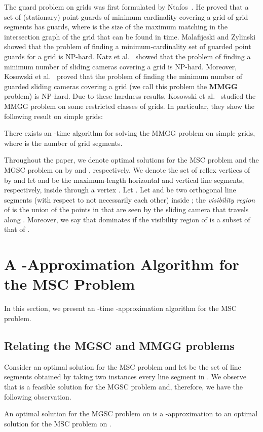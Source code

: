 \documentclass{llncs}
\begin{document}
The guard problem on grids was first formulated by Ntafos~\cite{ntafos1986}.
He proved that a set of (stationary) point guards of minimum cardinality covering a grid of
 grid segments has  guards, where  is the size of the maximum
matching in the intersection graph of the grid that can be found in 
time. Malafijeski and Zylinski~\cite{malafijeski2005} showed that the problem of
finding a minimum-cardinality set of guarded point guards for a grid is \textsc{NP}-hard.
Katz et al.~\cite{katz2005} showed that the problem of finding a minimum number
of sliding cameras covering a grid is \textsc{NP}-hard. Moreover,
Kosowski et al.~\cite{kosowski2004} proved that the problem of finding
the minimum number of guarded sliding cameras covering a grid (we call
this problem the {\bf MMGG} problem) is \textsc{NP}-hard.
Due to these hardness results, Kosowski et al.~\cite{adrian2006} studied
the MMGG problem on some restricted classes of grids. In particular, they show the following result
on simple grids:
\begin{theorem}
\label{thm:nSquarForGridProblem}
There exists an -time algorithm for solving the MMGG problem on
simple grids, where  is the number of grid segments.
\end{theorem}



Throughout the paper, we denote optimal solutions for the MSC problem and the MGSC problem on  by
 and , respectively.
We denote the set of reflex vertices of 
by  and let  and  be the maximum-length
horizontal and vertical line segments, respectively, inside  through a vertex
. Let .
Let  and  be two
orthogonal line segments (with respect to  not necessarily each other) inside ; the \emph{visibility region} of  is the union
of the points in  that are seen by the sliding camera that travels along . Moreover,
we say that  dominates  if the visibility
region of  is a subset of that of .

\section{A \boldmath-Approximation Algorithm for the MSC Problem}
\label{sec:3approxAlgorithm}In this section, we present an -time -approximation algorithm for the MSC problem.



\subsection{Relating the MGSC and MMGG problems}
Consider an optimal solution  for the MSC problem and let
 be the set of line segments obtained by taking two instances every line segment in . We
observe that  is a feasible solution for the MGSC problem and, therefore, we have
the following observation.
\begin{observation}
\label{obs:mgscAndMSC}
An optimal solution for the MGSC problem on  is a -approximation to an
optimal solution for the MSC problem on .
\end{observation}
\end{document}
